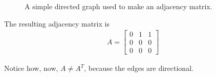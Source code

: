 \begin{figure}[H]
	\centering
	\caption{A simple directed graph used to make an adjacency matrix.}
	\label{fig:adjacency_directed}
\end{figure}

The resulting adjacency matrix is
$$\begin{array}{c} A=
		\begin{bmatrix}
			0 & 1 & 1 \\
			0 & 0 & 0 \\
			0 & 0 & 0
		\end{bmatrix}\end{array}$$

Notice how, now, $A \ne A^T$, because the edges are directional.

